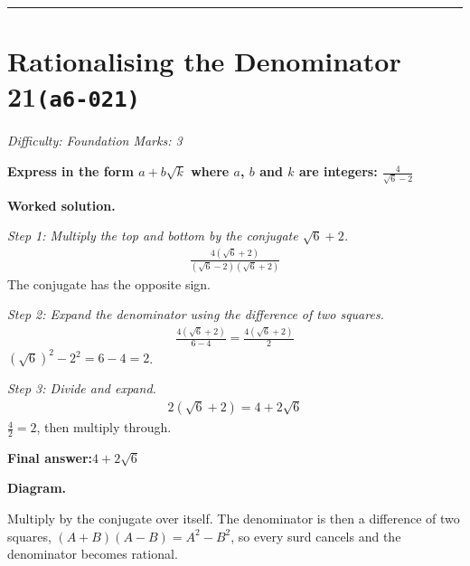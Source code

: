 \documentclass[11pt]{article}
\newcommand{\question}[1]{\par\medskip\noindent\textbf{#1}\par}
\begin{document}
\medskip\hrule

\section*{Rationalising the Denominator 21\quad\small\texttt{(a6-021)}}
\textit{Difficulty: Foundation \quad\textbar\quad Marks: 3}

\question{Express in the form \( a + b\sqrt{k} \) where \( a \), \( b \) and \( k \) are integers: \( \frac{4}{\sqrt{6} - 2} \)}

\textbf{Worked solution.}

\textit{Step 1: Multiply the top and bottom by the conjugate \( \sqrt{6} + 2 \).}
\[\begin{gathered}
\frac{4(\sqrt{6} + 2)}{(\sqrt{6} - 2)(\sqrt{6} + 2)}
\end{gathered}\]
The conjugate has the opposite sign.

\textit{Step 2: Expand the denominator using the difference of two squares.}
\[\begin{gathered}
\frac{4(\sqrt{6} + 2)}{6 - 4} = \frac{4(\sqrt{6} + 2)}{2}
\end{gathered}\]
\( (\sqrt{6})^2 - 2^2 = 6 - 4 = 2 \).

\textit{Step 3: Divide and expand.}
\[\begin{gathered}
2(\sqrt{6} + 2) = 4 + 2\sqrt{6}
\end{gathered}\]
\( \frac{4}{2} = 2 \), then multiply through.

\begin{answerbox}
\textbf{Final answer:}\quad \(\displaystyle 4 + 2\sqrt{6}\)
\end{answerbox}
\textbf{Diagram.}

\begin{center}
\end{center}
\small Multiply by the conjugate over itself. The denominator is then a difference of two squares, $(A+B)(A-B)=A^{2}-B^{2}$, so every surd cancels and the denominator becomes rational.\normalsize
\end{document}
